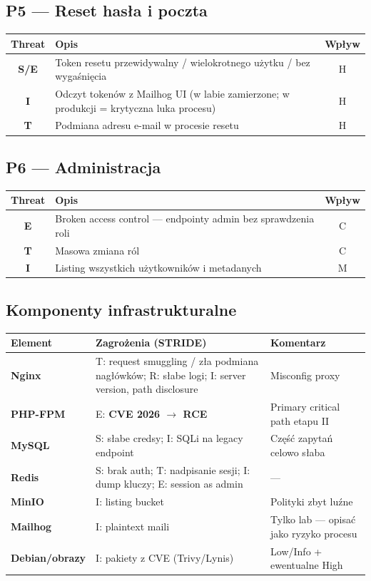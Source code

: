 \documentclass[11pt,a4paper]{article}
\begin{document}
\subsection{P5 — Reset hasła i poczta}

\begin{tabularx}{\textwidth}{@{}>{\bfseries}c L c@{}}
\toprule
\normalfont\textbf{Threat} & \textbf{Opis} & \textbf{Wpływ} \\
\midrule
S/E & Token resetu przewidywalny / wielokrotnego użytku / bez wygaśnięcia & H \\
I & Odczyt tokenów z Mailhog UI (w labie zamierzone; w produkcji = krytyczna luka procesu) & H \\
T & Podmiana adresu e-mail w procesie resetu & H \\
\bottomrule
\end{tabularx}

\subsection{P6 — Administracja}

\begin{tabularx}{\textwidth}{@{}>{\bfseries}c L c@{}}
\toprule
\normalfont\textbf{Threat} & \textbf{Opis} & \textbf{Wpływ} \\
\midrule
E & Broken access control — endpointy admin bez sprawdzenia roli & C \\
T & Masowa zmiana ról & C \\
I & Listing wszystkich użytkowników i metadanych & M \\
\bottomrule
\end{tabularx}

\subsection{Komponenty infrastrukturalne}

\begin{tabularx}{\textwidth}{@{}>{\bfseries}l L L@{}}
\toprule
\normalfont\textbf{Element} & \textbf{Zagrożenia (STRIDE)} & \textbf{Komentarz} \\
\midrule
Nginx & T: request smuggling / zła podmiana nagłówków; R: słabe logi; I: server version, path disclosure & Misconfig proxy \\
PHP-FPM & E: \textbf{CVE 2026 $\rightarrow$ RCE} & Primary critical path etapu II \\
MySQL & S: słabe credsy; I: SQLi na legacy endpoint & Część zapytań celowo słaba \\
Redis & S: brak auth; T: nadpisanie sesji; I: dump kluczy; E: session as admin & — \\
MinIO & I: listing bucket & Polityki zbyt luźne \\
Mailhog & I: plaintext maili & Tylko lab — opisać jako ryzyko procesu \\
Debian/obrazy & I: pakiety z CVE (Trivy/Lynis) & Low/Info + ewentualne High \\
\bottomrule
\end{tabularx}
\end{document}
